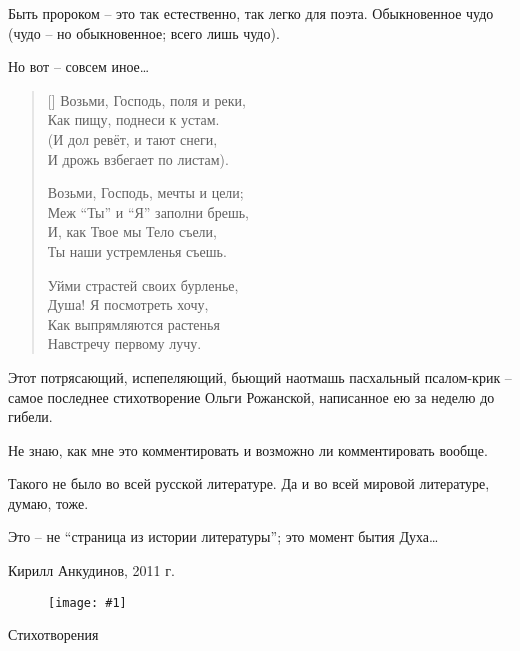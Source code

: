 \documentclass[12pt,a5paper,twoside]{article}
\newcommand{\pict}[1]{\thispagestyle{empty}\begin{figure}[H]\begin{center}\texttt{[image: \#1]}\end{center}\end{figure}\newpage}
\begin{document}
Быть пророком -- это так естественно, так легко для поэта. Обыкновенное чудо (чудо -- но обыкновенное; всего лишь чудо).

Но вот -- совсем иное…

\settowidth{\versewidth}{Возьми, Господь, поля и реки,}
\begin{verse}[\versewidth]
Возьми, Господь, поля и реки,\\
Как пищу, поднеси к устам.\\
(И дол ревёт, и тают снеги,\\
И дрожь взбегает по листам).

Возьми, Господь, мечты и цели;\\
Меж “Ты” и  “Я” заполни брешь,\\
И, как Твое мы Тело съели,\\
Ты наши устремленья съешь.

Уйми страстей своих бурленье,\\
Душа! Я посмотреть хочу,\\
Как выпрямляются растенья\\
Навстречу первому лучу.
\end{verse}
  
Этот потрясающий, испепеляющий, бьющий наотмашь пасхальный псалом-крик -- самое последнее стихотворение Ольги Рожанской, написанное ею за неделю до гибели.

Не знаю, как мне это комментировать и возможно ли комментировать вообще.

Такого не было во всей русской литературе. Да и во всей мировой литературе, думаю, тоже.

Это -- не ``страница из истории литературы''; это момент бытия Духа…
\begin{flushright}
Кирилл Анкудинов, 2011 г.
\end{flushright}
\newpage
\pict{picts/zastavka.png} 
\begin{center}
\bigskip
\thispagestyle{empty}
\vspace*{3cm}
\Huge{Стихотворения}
\end{center}

\newpage
\end{document}
